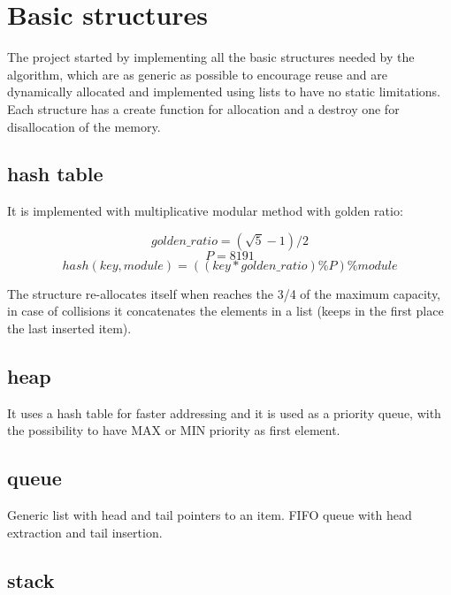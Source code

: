 \section{Basic structures}
\label{Sec:basic_structures}

The project started by implementing all the basic structures needed by the algorithm, which are as generic as possible to encourage reuse and are dynamically allocated and implemented using lists to have no static limitations.
\\
Each structure has a create function for allocation and a destroy one for disallocation of the memory.

\subsection{hash table}
\label{hash_table}

It is implemented with multiplicative modular method with golden ratio:

\begin{equation}
    golden\_ratio = (\sqrt{5} - 1)/2
\end{equation}
\begin{equation}
    P = 8191
\end{equation}
\begin{equation}
    hash(key, module) = ((key*golden\_ratio)\%P)\%module
\end{equation}

The structure re-allocates itself when reaches the 3/4 of the maximum capacity, in case of collisions it concatenates the elements in a list (keeps in the first place the last inserted item).

\subsection{heap}
\label{heap}

It uses a hash table for faster addressing and it is used as a priority queue, with the possibility to have MAX or MIN priority as first element.

\subsection{queue}

Generic list with head and tail pointers to an item. FIFO queue with head extraction and tail insertion.

\subsection{stack}
\label{stack}

